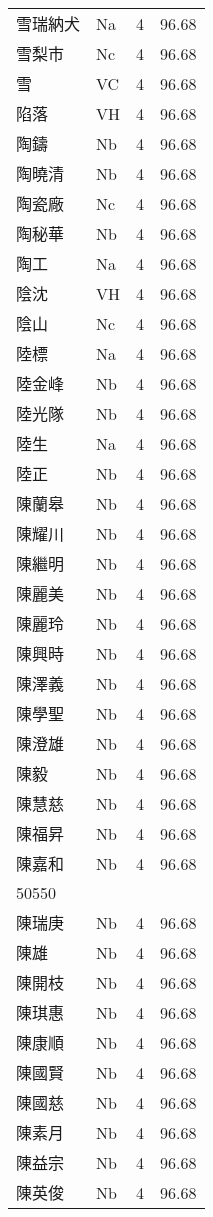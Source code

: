 \documentclass[twocolumn]{book}
\begin{document}
\begin{supertabular}{llrr}
雪瑞納犬 & Na & 4 &  96.68\\
雪梨市 & Nc & 4 &  96.68\\
雪 & VC & 4 &  96.68\\
陷落 & VH & 4 &  96.68\\
陶鑄 & Nb & 4 &  96.68\\
陶曉清 & Nb & 4 &  96.68\\
陶瓷廠 & Nc & 4 &  96.68\\
陶秘華 & Nb & 4 &  96.68\\
陶工 & Na & 4 &  96.68\\
陰沈 & VH & 4 &  96.68\\
陰山 & Nc & 4 &  96.68\\
陸標 & Na & 4 &  96.68\\
陸金峰 & Nb & 4 &  96.68\\
陸光隊 & Nb & 4 &  96.68\\
陸生 & Na & 4 &  96.68\\
陸正 & Nb & 4 &  96.68\\
陳蘭皋 & Nb & 4 &  96.68\\
陳耀川 & Nb & 4 &  96.68\\
陳繼明 & Nb & 4 &  96.68\\
陳麗美 & Nb & 4 &  96.68\\
陳麗玲 & Nb & 4 &  96.68\\
陳興時 & Nb & 4 &  96.68\\
陳澤義 & Nb & 4 &  96.68\\
陳學聖 & Nb & 4 &  96.68\\
陳澄雄 & Nb & 4 &  96.68\\
陳毅 & Nb & 4 &  96.68\\
陳慧慈 & Nb & 4 &  96.68\\
陳福昇 & Nb & 4 &  96.68\\
陳嘉和 & Nb & 4 &  96.68\\
50550\\
陳瑞庚 & Nb & 4 &  96.68\\
陳雄 & Nb & 4 &  96.68\\
陳開枝 & Nb & 4 &  96.68\\
陳琪惠 & Nb & 4 &  96.68\\
陳康順 & Nb & 4 &  96.68\\
陳國賢 & Nb & 4 &  96.68\\
陳國慈 & Nb & 4 &  96.68\\
陳素月 & Nb & 4 &  96.68\\
陳益宗 & Nb & 4 &  96.68\\
陳英俊 & Nb & 4 &  96.68\\

\end{supertabular}
\end{document}
